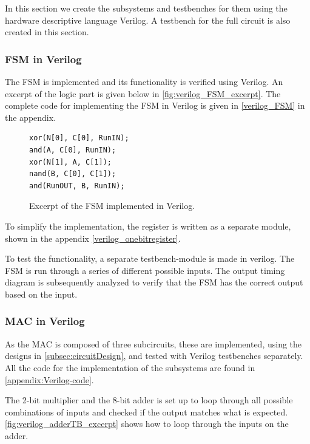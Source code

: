 In this section we create the subsystems and testbenches for them using the hardware descriptive language Verilog. A testbench for the full circuit is also created in this section.

\subsubsection{FSM in Verilog}
\label{subsec:fsm_verilog}

The FSM is implemented and its functionality is verified using Verilog. An excerpt of the logic part is given below in \autoref{fig:verilog_FSM_excerpt}. The complete code for implementing the FSM in Verilog is given in \autoref{verilog_FSM} in the appendix.


\begin{figure}[H]
\centering
\caption{Excerpt of the FSM implemented in Verilog.}
\label{fig:verilog_FSM_excerpt}
\begin{minipage}{0.33\textwidth}
\begin{lstlisting}[style=verilogStyle]
xor(N[0], C[0], RunIN);
and(A, C[0], RunIN);
xor(N[1], A, C[1]);
nand(B, C[0], C[1]);
and(RunOUT, B, RunIN);
\end{lstlisting}
\end{minipage}
\end{figure}


To simplify the implementation, the register is written as a separate module, shown in the appendix \autoref{verilog_onebitregister}.

To test the functionality, a separate testbench-module is made in verilog. The FSM is run through a series of different possible inputs. The output timing diagram is subsequently analyzed to verify that the FSM has the correct output based on the input.

\subsubsection{MAC in Verilog}
\label{subsubsec:MAC_in_verilog}

As the MAC is composed of three subcircuits, these are implemented, using the designs in \autoref{subsec:circuitDesign}, and tested with Verilog testbenches separately. All the code for the implementation of the subsystems are found in \autoref{appendix:Verilog-code}. 

The 2-bit multiplier and the 8-bit adder is set up to loop through all possible combinations of inputs and checked if the output matches what is expected. \autoref{fig:verilog_adderTB_excerpt} shows how to loop through the inputs on the adder.

